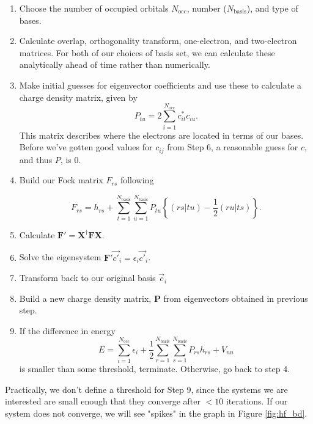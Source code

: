 \documentclass[journal=jacsat,manuscript=communication]{achemso}
\newcommand{\matr}[1]{\mathbf{#1}}
\begin{document}
\begin{enumerate}
	\item Choose the number of occupied orbitals $N_\mathrm{occ}$, number ($N_\mathrm{basis}$), and type of bases.
	\item Calculate overlap, orthogonality transform, one-electron, and two-electron matrices.  For both of our choices of basis set, we can calculate these analytically ahead of time rather than numerically.
	\item Make initial guesses for eigenvector coefficients and use these to calculate a charge density matrix, given by
\begin{equation}
	P_{tu} = 2 \sum_{i=1}^{N_{\mathrm{occ}}}c^*_{it}c_{iu}.
\end{equation}
	This matrix describes where the electrons are located in terms of our bases.  Before we've gotten good values for $c_{ij}$ from Step 6, a reasonable guess for $c$, and thus $P$, is 0.  
	\item Build our Fock matrix $F_{rs}$ following

\begin{equation}
	F_{rs} = h_{rs} + \sum_{t=1}^{N_\mathrm{basis}}\sum_{u=1}^{N_\mathrm{basis}}P_{tu}\left\{(rs|tu) -\frac{1}{2}(ru|ts)\right\}.
\end{equation}
	\item Calculate $\matr{F}' = \matr{X}^\dag\matr{F}\matr{X}$.
	\item Solve the eigensystem $\matr{F}'\vec{c'}_i=\epsilon_i\vec{c'}_i$.
	\item Transform back to our original basis $\vec{c}_i$
	\item Build a new charge density matrix, $\matr{P}$ from eigenvectors obtained in previous step.
	\item If the difference in energy 
\begin{equation}
	E = \sum_{i=1}^{N_\mathrm{occ}}\epsilon_i + \frac{1}{2} \sum_{r=1}^{N_\mathrm{basis}} \sum_{s=1}^{N_\mathrm{basis}}P_{rs}h_{rs}+V_{nn}
	\label{eq:hf_energy}
\end{equation}
is smaller than some threshold, terminate.  Otherwise, go back to step 4.
\end{enumerate}

Practically, we don't define a threshold for Step 9, since the systems we are interested are small enough that they converge after $<10$ iterations.  If our system does not converge, we will see "spikes" in the graph in Figure \ref{fig:hf_bd}\cite{schrierIntroductionComputationalPhysical2017}.
\end{document}
